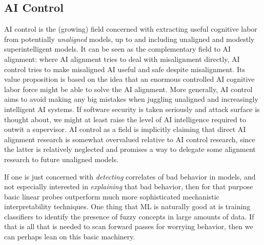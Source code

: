 \subsection{AI Control}
AI control \cite{greenblatt2024aicontrol} is the (growing) field concerned with
extracting useful cognitive labor from potentially \emph{unaligned} models, up
to and including unaligned and modestly superintelligent models. It can be seen
as the complementary field to AI alignment: where AI alignment tries to deal
with misalignment directly, AI control tries to make misaligned AI useful and
safe despite misalignment. Its value proposition is based on the idea that an
enormous controlled AI cognitive labor force might be able to solve the AI
alignment. More generally, AI control aims to avoid making any big mistakes
when juggling unaligned and increasingly intelligent AI systems. If software
security is taken seriously and attack surface is thought about, we might at
least raise the level of AI intelligence required to outwit a supervisor. AI
control as a field is implicitly claiming that direct AI alignment research is
somewhat overvalued relative to AI control research, since the latter is
relatively neglected and promises a way to delegate some alignment research to
future unaligned models.

If one is just concerned with \emph{detecting} correlates of bad behavior in
models, and not especially interested in \emph{explaining} that bad behavior,
then for that purpose basic linear probes outperform much more sophisticated
mechanistic interpretability techniques. One thing that ML is naturally good at
is training classifiers to identify the presence of fuzzy concepts in large
amounts of data. If that is all that is needed to scan forward passes for
worrying behavior, then we can perhaps lean on this basic machinery.

